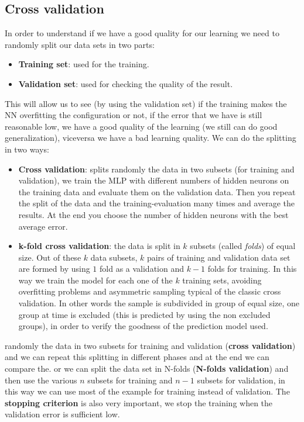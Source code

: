 \documentclass{article}
\begin{document}
\subsection{Cross validation}
In order to understand if we have a good quality for our learning we need to
randomly split our data sets in two parts:
\begin{itemize}
    \item \textbf{Training set}: used for the training.
    \item \textbf{Validation set}: used for checking the quality of the result.
\end{itemize}
This will allow us to see (by using the validation set) if the training makes the NN overfitting the configuration or
not, if the error that we have is still reasonable low, we have a good quality of the learning
(we still can do good generalization), viceversa we have a bad learning quality.
\newline\newline
We can do the splitting in two ways:
\begin{itemize}
    \item \textbf{Cross validation}: splits randomly the data in two subsets (for training and validation),
          we train the MLP with different numbers of hidden neurons on the training data and evaluate them on the
          validation data. Then you repeat the split of the data and the training-evaluation many times and average the
          results. At the end you choose the number of hidden neurons with the best average error.

    \item \textbf{k-fold cross validation}: the data is split in $k$ subsets (called \textit{folds}) of
          equal size. Out of these
          $k$ data subsets, $k$ pairs of training and validation data set are formed by using $1$ fold as a validation
          and $k-1$ folds for training. In this way we train the model for each one of the $k$ training sets, avoiding
          overfitting problems and asymmetric sampling typical of the classic cross validation. In other words the
          sample is subdivided in group of equal size, one group at time is excluded (this is predicted by using the
          non excluded groups), in order to verify the goodness of the prediction model used.
\end{itemize}
randomly the data in two subsets for training and validation (\textbf{cross validation}) and we can repeat this splitting in different
phases and at the end we can compare the. or we can split the data set in N-folds (\textbf{N-folds validation})
and then use the various $n$ subsets for training and $n-1$ subsets for validation, in this way we can use
most of the example for training instead of validation.
\newline\newline
The \textbf{stopping criterion} is also very important, we stop the training when the validation
error is sufficient low.
\end{document}
